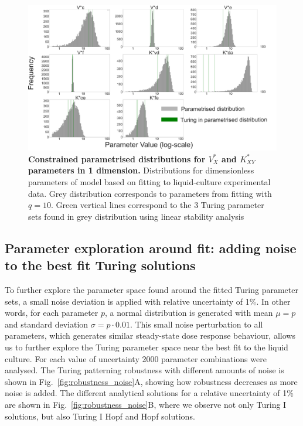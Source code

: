 \begin{figure}[H] %
    \centering
    \begin{adjustbox}{center}
        \includegraphics[width=1\textwidth]{chapters/Chapter 2/1d_distributions} %
    \end{adjustbox}
    \caption{\textbf{Constrained parametrised distributions for $V^*_X$ and $K^*_{XY}$ parameters in 1 dimension.} Distributions for dimensionless parameters of model based on fitting to liquid-culture experimental data. Grey distribution corresponds to parameters from fitting with $q=10$. Green vertical lines correspond to the 3 Turing parameter sets found in grey distribution using linear stability analysis }
    \label{fig:1d_distributions} %
\end{figure}

\subsection{Parameter exploration around fit: adding noise to the best fit Turing solutions}
To further explore the parameter space found around the fitted Turing parameter sets, a small noise deviation is applied with relative uncertainty of 1\%.
In other words, for each parameter $p$, a normal distribution is generated with mean $\mu=p$ and standard deviation $\sigma=p\cdot 0.01$.
This small noise perturbation to all parameters, which generates similar steady-state dose response behaviour, allows us to further explore the Turing parameter space near the best fit to the liquid culture.
For each value of uncertainty 2000 parameter combinations were analysed.
The Turing patterning robustness with different amounts of noise is shown in Fig.~\ref{fig:robustness_noise}A, showing how robustness decreases as more noise is added.
The different analytical solutions for a relative uncertainty of 1\% are shown in Fig.~\ref{fig:robustness_noise}B, where we observe not only Turing I solutions, but also Turing I Hopf and Hopf solutions.


